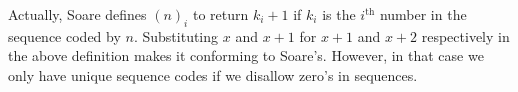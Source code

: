 \documentclass[a4paper,11pt]{article}
\begin{document}
\begin{enumerate}
Actually, Soare defines $(n)_i$ to return $k_i+1$ if $k_i$ is
the $i^{\text{th}}$ number in the sequence coded by $n$. Substituting $x$ and
$x+1$ for $x+1$ and $x+2$ respectively in the above definition makes it
conforming to Soare's. However, in that case we only have unique
sequence codes if we disallow zero's in sequences.


\end{enumerate}
\end{document}
